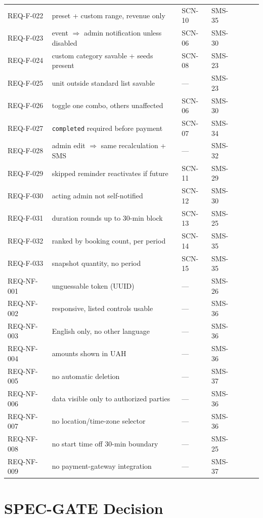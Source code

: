 \documentclass[11pt,a4paper]{article}
\begin{document}
\begin{longtable}{L{1.7cm}L{2.3cm}L{1.6cm}L{1.4cm}L{1.4cm}L{1.4cm}L{1.4cm}}
REQ-F-022 & preset + custom range, revenue only & SCN-10 & SMS-35 & & &  \\
REQ-F-023 & event $\Rightarrow$ admin notification unless disabled & SCN-06 & SMS-30 & & &  \\
REQ-F-024 & custom category savable + seeds present & SCN-08 & SMS-23 & & &  \\
REQ-F-025 & unit outside standard list savable & --- & SMS-23 & & &  \\
REQ-F-026 & toggle one combo, others unaffected & SCN-06 & SMS-30 & & &  \\
REQ-F-027 & \texttt{completed} required before payment & SCN-07 & SMS-34 & & &  \\
REQ-F-028 & admin edit $\Rightarrow$ same recalculation + SMS & --- & SMS-32 & & &  \\
REQ-F-029 & skipped reminder reactivates if future & SCN-11 & SMS-29 & & &  \\
REQ-F-030 & acting admin not self-notified & SCN-12 & SMS-30 & & &  \\
REQ-F-031 & duration rounds up to 30-min block & SCN-13 & SMS-25 & & &  \\
REQ-F-032 & ranked by booking count, per period & SCN-14 & SMS-35 & & &  \\
REQ-F-033 & snapshot quantity, no period & SCN-15 & SMS-35 & & &  \\
REQ-NF-001 & unguessable token (UUID) & --- & SMS-26 & & &  \\
REQ-NF-002 & responsive, listed controls usable & --- & SMS-36 & & &  \\
REQ-NF-003 & English only, no other language & --- & SMS-36 & & &  \\
REQ-NF-004 & amounts shown in UAH & --- & SMS-36 & & &  \\
REQ-NF-005 & no automatic deletion & --- & SMS-37 & & &  \\
REQ-NF-006 & data visible only to authorized parties & --- & SMS-36 & & &  \\
REQ-NF-007 & no location/time-zone selector & --- & SMS-36 & & &  \\
REQ-NF-008 & no start time off 30-min boundary & --- & SMS-25 & & &  \\
REQ-NF-009 & no payment-gateway integration & --- & SMS-37 & & &  \\

\bottomrule
\end{longtable}

\section{SPEC-GATE Decision}
\label{sec:gate}
\end{document}
